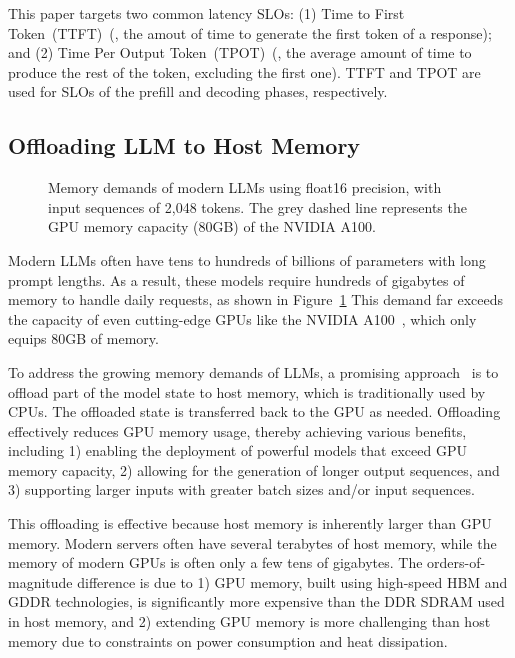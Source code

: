 This paper targets two common latency SLOs: (1) Time to First Token~(TTFT)~(\ie, the amout of time to generate the first token of 
a response); 
%
and (2) Time Per Output Token~(TPOT)~(\ie, the average amount of time to 
produce the rest of the token, excluding the first one). 
%
TTFT and TPOT are used for SLOs of the prefill and decoding phases, respectively. 

\subsection{Offloading LLM to Host Memory}
\label{sec:offloading}
%

\begin{figure}[t]
    \centering
    \resizebox{0.65\columnwidth}{!}{%
 }
    \caption{Memory demands of modern LLMs using float16 precision, with input sequences of 2,048 tokens. 
 The grey dashed line represents the GPU memory capacity (80GB) of the NVIDIA A100.}
    \label{fig:memoryuse}
\end{figure}


Modern LLMs often have tens to hundreds of billions of parameters with long prompt lengths. 
%
As a result, these models require hundreds of gigabytes of memory to handle daily requests, as shown in Figure~\ref{fig:memoryuse}
%
This demand far exceeds the capacity of even cutting-edge GPUs like the NVIDIA A100~\cite{A100}, which only equips 80GB of memory.
%

To address the growing memory demands of LLMs, a promising approach~\cite{lorazerooffload} 
is to offload part of the model state to host memory, which is traditionally used by CPUs. 
%
The offloaded state is transferred back to the GPU as needed. 
%
Offloading effectively reduces GPU memory usage, thereby achieving various benefits, including 1) enabling the deployment of powerful models that exceed GPU memory capacity, 2) allowing for the generation of longer output sequences, and 3) supporting larger inputs with greater batch sizes and/or input sequences. 

%
This offloading is effective because host memory is inherently larger than GPU memory. 
%
Modern servers often have several terabytes of host memory, while 
the memory of modern GPUs is often only a few tens of gigabytes. 
%
The orders-of-magnitude difference is due to 1) GPU memory, built using high-speed HBM and GDDR technologies, is significantly more expensive than the DDR SDRAM used in host memory, and 2) extending GPU memory is more challenging than host memory due to constraints on power consumption and heat dissipation. 

